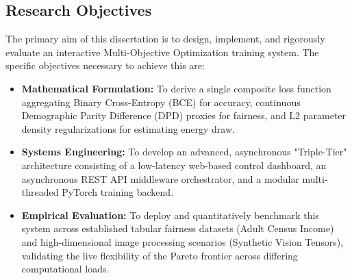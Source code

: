 \documentclass[12pt,a4paper]{article}
\begin{document}
\subsection{Research Objectives}
The primary aim of this dissertation is to design, implement, and rigorously evaluate an interactive Multi-Objective Optimization training system. The specific objectives necessary to achieve this are:
\begin{itemize}
    \item \textbf{Mathematical Formulation:} To derive a single composite loss function aggregating Binary Cross-Entropy (BCE) for accuracy, continuous Demographic Parity Difference (DPD) proxies for fairness, and L2 parameter density regularizations for estimating energy draw.
    \item \textbf{Systems Engineering:} To develop an advanced, asynchronous "Triple-Tier" architecture consisting of a low-latency web-based control dashboard, an asynchronous REST API middleware orchestrator, and a modular multi-threaded PyTorch training backend.
    \item \textbf{Empirical Evaluation:} To deploy and quantitatively benchmark this system across established tabular fairness datasets (Adult Census Income) and high-dimensional image processing scenarios (Synthetic Vision Tensors), validating the live flexibility of the Pareto frontier across differing computational loads.
\end{itemize}
\end{document}
